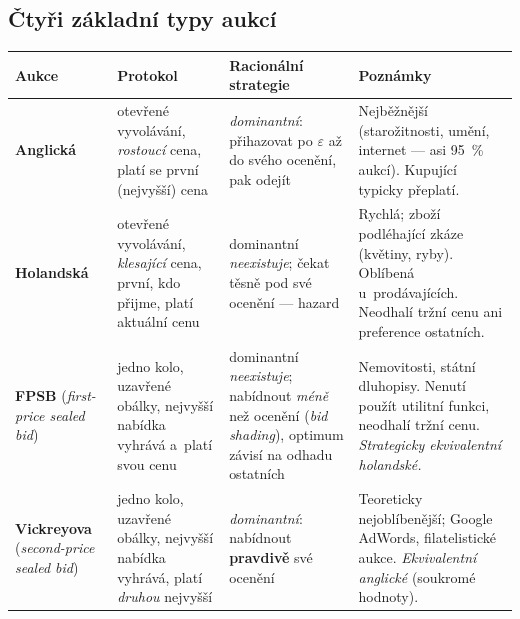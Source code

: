 \documentclass[11pt,a4paper]{article}
\theoremstyle{definition}
\begin{document}
\subsection{Čtyři základní typy aukcí}

\begin{center}\small
\begin{tabular}{@{}p{}
  >{\raggedright\arraybackslash}p{}
  >{\raggedright\arraybackslash}p{}
  >{\raggedright\arraybackslash}p{}@{}}
\toprule
\textbf{Aukce} & \textbf{Protokol} & \textbf{Racionální strategie} & \textbf{Poznámky} \\
\midrule
\textbf{Anglická}
  & otevřené vyvolávání, \emph{rostoucí} cena, platí se první (nejvyšší) cena
  & \emph{dominantní}: přihazovat po $\varepsilon$ až do svého ocenění, pak odejít
  & Nejběžnější (starožitnosti, umění, internet --- asi 95~\% aukcí). Kupující typicky
    přeplatí. \\
\textbf{Holandská}
  & otevřené vyvolávání, \emph{klesající} cena, první, kdo přijme, platí aktuální cenu
  & dominantní \emph{neexistuje}; čekat těsně pod své ocenění --- hazard
  & Rychlá; zboží podléhající zkáze (květiny, ryby). Oblíbená u~prodávajících. Neodhalí tržní
    cenu ani preference ostatních. \\
\textbf{FPSB} \newline (\emph{first-price sealed bid})
  & jedno kolo, uzavřené obálky, nejvyšší nabídka vyhrává a~platí svou cenu
  & dominantní \emph{neexistuje}; nabídnout \emph{méně} než ocenění (\emph{bid shading}),
    optimum závisí na odhadu ostatních
  & Nemovitosti, státní dluhopisy. Nenutí použít utilitní funkci, neodhalí tržní cenu.
    \emph{Strategicky ekvivalentní holandské.} \\
\textbf{Vickreyova} \newline (\emph{second-price sealed bid})
  & jedno kolo, uzavřené obálky, nejvyšší nabídka vyhrává, platí \emph{druhou} nejvyšší
  & \emph{dominantní}: nabídnout \textbf{pravdivě} své ocenění
  & Teoreticky nejoblíbenější; Google AdWords, filatelistické aukce.
    \emph{Ekvivalentní anglické} (soukromé hodnoty). \\
\bottomrule
\end{tabular}
\end{center}
\end{document}

